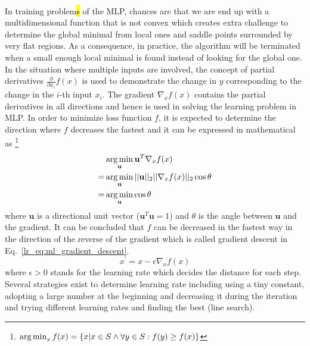 \paragraph{}
In training problem\hl{s} of the MLP, chances are that we are end up with a multidimensional function that is not convex which creates extra challenge to determine the global minimal from local ones and saddle points surrounded by very flat regions.
As a consequence, in practice, the algorithm will be terminated when a small enough local minimal is found instead of looking for the global one.
In the situation where multiple inputs are involved, the concept of partial derivatives $\frac{\partial}{\partial x_i}f(x)$ is used to demonstrate the change in $y$ corresponding to the change in the $i$-th input $x_i$.
The gradient $\nabla_x f(x)$ contains the partial derivatives in all directions and hence is used in solving the learning problem in MLP.
In order to minimize loss function $f$, it is expected to determine the direction where $f$ decreases the fastest and it can be expressed in mathematical as \footnote{$\operatorname*{arg\,min}_x f(x) = \left\{
    x | x \in S \wedge \forall y \in S : f(y) \geq f(x)
\right\}$}
\begin{equation}
    \begin{aligned}
    & \operatorname*{arg\,min}_{\mathbf{u}} \mathbf{u}^T \nabla_x f(x)\\
    = & \operatorname*{arg\,min}_{\mathbf{u}} || \mathbf{u} ||_2 ||\nabla_xf(x)||_2 \cos\theta \\
    = & \operatorname*{arg\,min}_{\mathbf{u}} \cos\theta
    \end{aligned}
\end{equation}
%
where $\mathbf{u}$ is a directional unit vector ($\mathbf{u}^T\mathbf{u}=1$) and $\theta$ is the angle between $\mathbf{u}$ and the gradient.
It can be concluded that $f$ can be decreased in the fastest way in the direction of the reverse of the gradient which is called gradient descent in Eq.~\ref{lr_eq:ml_gradient_descent}.
\begin{equation}
    x^\prime = x - \epsilon \nabla_x f(x)
    \label{lr_eq:ml_gradient_descent}
\end{equation}
%
where $\epsilon > 0$ stands for the learning rate which decides the distance for each step.
Several strategies exist to determine learning rate including using a tiny constant, adopting a large number at the beginning and decreasing it during the iteration and trying different learning rates and finding the best (line search).

